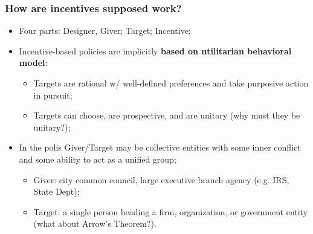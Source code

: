 \documentclass[aspectratio=169]{beamer}
\theoremstyle{principle}
\begin{document}
\begin{frame}
\frametitle{How are incentives supposed work?}

\begin{itemize}
\item Four parts: Designer, Giver; Target; Incentive;
\bigskip
\bigskip
\item Incentive-based policies are implicitly \textbf{based on utilitarian behavioral model}:
\begin{itemize}
\item Targets are rational w/ well-defined preferences and take purposive action in pursuit;
\item Targets can choose, are prospective, and are unitary (why must they be unitary?);
\end{itemize}
\bigskip
\bigskip
\item In the polis Giver/Target may be collective entities with some inner conflict and some ability to act as a unified group;
\begin{itemize}
\item Giver: city common council, large executive branch agency (e.g. IRS, State Dept);
\item Target: a single person heading a firm, organization, or government entity (what about Arrow's Theorem?).
\end{itemize}
\end{itemize}

\end{frame}
\end{document}
